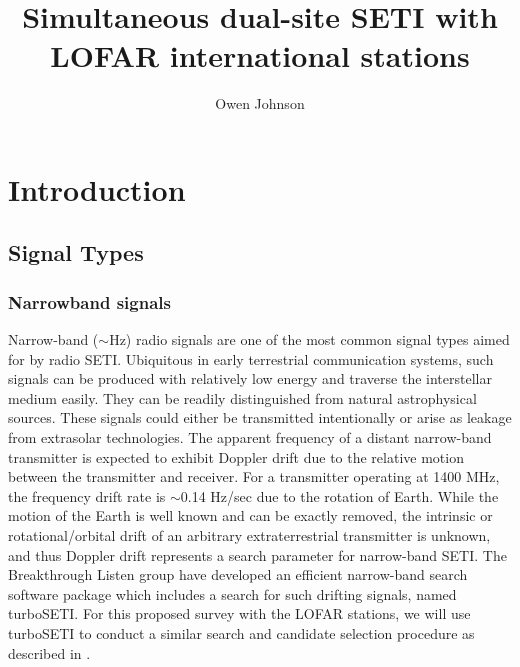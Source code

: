 \documentclass{aastex63}
\begin{document}
\title{Simultaneous dual-site SETI with LOFAR international stations}

\author[0000-0002-5927-0481]{Owen Johnson}


\begin{abstract}
\end{abstract}

\keywords{}


\section{Introduction}
\label{sect:intro}


\subsection{Signal Types}
\label{sect:signal_types}

\subsubsection{Narrowband signals}
Narrow-band ($\sim$Hz) radio signals are one of the most common signal types aimed for by radio SETI. Ubiquitous in early terrestrial communication systems, such signals can be produced with relatively low energy and traverse the interstellar medium easily. They can be readily distinguished from natural astrophysical sources. These signals could either be transmitted intentionally or arise as leakage from extrasolar technologies. The apparent frequency of a distant narrow-band transmitter is expected to exhibit Doppler drift due to the relative motion between the transmitter and receiver. For a transmitter operating at 1400 MHz, the frequency drift rate is $\sim$0.14 Hz/sec due to the rotation of Earth. While the motion of the Earth is well known and can be exactly removed, the intrinsic or rotational/orbital drift of an arbitrary extraterrestrial transmitter is unknown, and thus Doppler drift represents a search parameter for narrow-band SETI. The Breakthrough Listen group have developed an efficient narrow-band search software package which includes a search for such drifting signals, named turboSETI. For this proposed survey with the LOFAR stations, we will use turboSETI to conduct a similar search and candidate selection procedure as described in \cite{Enriquez:2017}. 
\end{document}
